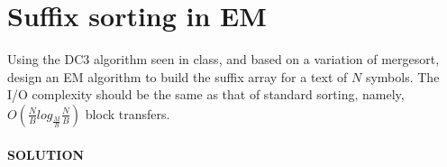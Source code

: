 \documentclass[a4paper]{article}
\begin{document}
\section*{Suffix sorting in EM}
Using the DC3 algorithm seen in class, and based on a variation
of mergesort, design an EM algorithm to build the suffix array for a text of $N$
symbols. The I/O complexity should be the same as that of standard sorting, namely,
$O(\frac{N}{B} log_{\frac{M}{B}} \frac{N}{B})$ block transfers.
\\
\\
\textbf{SOLUTION}
\\
\\
\end{document}
